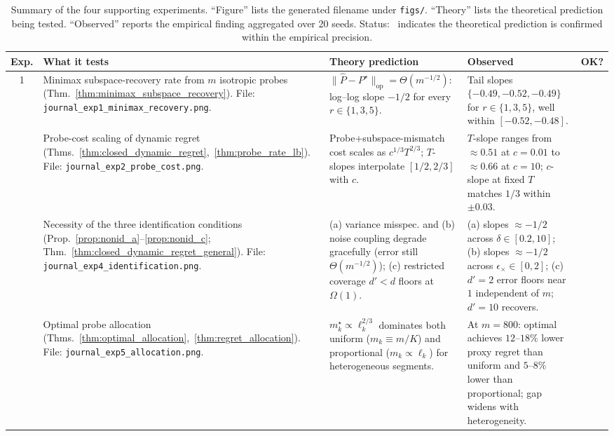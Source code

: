 \documentclass[11pt]{article}
\newcommand{\op}{\mathrm{op}}
\newcommand{\cmark}{\ding{51}}
\begin{document}
\begin{table}[t]
\centering
\caption{Summary of the four supporting experiments.
``Figure'' lists the generated filename under \texttt{figs/}.
``Theory'' lists the theoretical prediction being tested.
``Observed'' reports the empirical finding aggregated over 20 seeds.
Status: \cmark\ indicates the theoretical prediction is confirmed within
the empirical precision.}
\label{tab:exp_summary}
\small
\renewcommand{\arraystretch}{1.25}
\begin{tabularx}{\linewidth}{@{}c>{\raggedright\arraybackslash}X>{\raggedright\arraybackslash}X>{\raggedright\arraybackslash}Xc@{}}
\toprule
\textbf{Exp.} & \textbf{What it tests} & \textbf{Theory prediction} & \textbf{Observed} & \textbf{OK?} \\
\midrule
1 & Minimax subspace-recovery rate from $m$ isotropic probes
  (Thm.~\ref{thm:minimax_subspace_recovery}).
  File: \texttt{journal\_exp1\_minimax\_recovery.png}.
  & $\|\widehat P-P^\star\|_{\op}=\Theta(m^{-1/2})$: log--log slope $-1/2$
  for every $r\in\{1,3,5\}$.
  & Tail slopes $\{-0.49,-0.52,-0.49\}$ for $r\in\{1,3,5\}$, well within
  $[-0.52,-0.48]$.
  & \cmark \\
\addlinespace
2 & Probe-cost scaling of dynamic regret
  (Thms.~\ref{thm:closed_dynamic_regret},~\ref{thm:probe_rate_lb}).
  File: \texttt{journal\_exp2\_probe\_cost.png}.
  & Probe+subspace-mismatch cost scales as
  $c^{1/3}T^{2/3}$; $T$-slopes interpolate $[1/2,2/3]$ with $c$.
  & $T$-slope ranges from $\approx 0.51$ at $c{=}0.01$ to
  $\approx 0.66$ at $c{=}10$; $c$-slope at fixed $T$ matches $1/3$
  within $\pm 0.03$.
  & \cmark \\
\addlinespace
3 & Necessity of the three identification conditions
  (Prop.~\ref{prop:nonid_a}--\ref{prop:nonid_c};
  Thm.~\ref{thm:closed_dynamic_regret_general}).
  File: \texttt{journal\_exp4\_identification.png}.
  & (a) variance misspec. and (b) noise coupling degrade gracefully
  (error still $\Theta(m^{-1/2})$);
  (c) restricted coverage $d'<d$ floors at $\Omega(1)$.
  & (a) slopes $\approx -1/2$ across $\delta\in[0.2,10]$;
  (b) slopes $\approx -1/2$ across $\epsilon_\times\in[0,2]$;
  (c) $d'=2$ error floors near $1$ independent of $m$; $d'=10$ recovers.
  & \cmark \\
\addlinespace
4 & Optimal probe allocation
  (Thms.~\ref{thm:optimal_allocation},~\ref{thm:regret_allocation}).
  File: \texttt{journal\_exp5\_allocation.png}.
  & $m_k^\star\propto\ell_k^{2/3}$ dominates both uniform
  ($m_k\equiv m/K$) and proportional ($m_k\propto\ell_k$) for
  heterogeneous segments.
  & At $m{=}800$: optimal achieves $12\text{--}18\%$ lower proxy regret
  than uniform and $5\text{--}8\%$ lower than proportional; gap widens with
  heterogeneity.
  & \cmark \\
\bottomrule
\end{tabularx}
\end{table}
\end{document}
